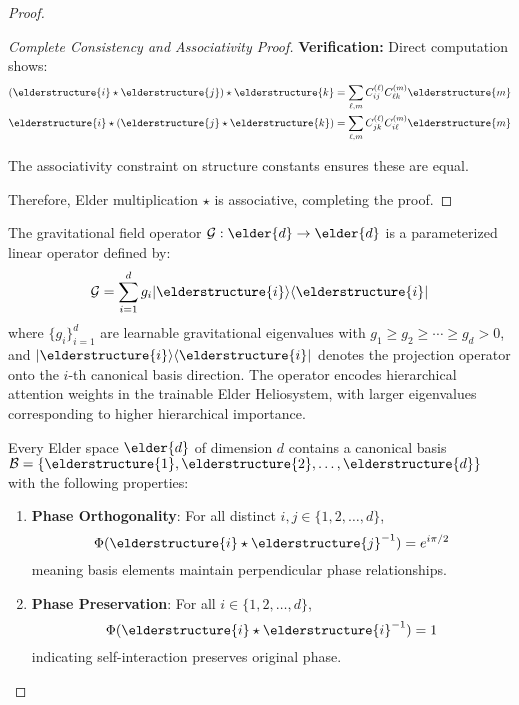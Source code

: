 \begin{proof}
\begin{proof}[Complete Consistency and Associativity Proof]
\textbf{Verification:} Direct computation shows:
\begin{align}
(\elderstructure{i} \star \elderstructure{j}) \star \elderstructure{k} &= \sum_{\ell,m} C_{ij}^{(\ell)} C_{\ell k}^{(m)} \elderstructure{m}\\
\elderstructure{i} \star (\elderstructure{j} \star \elderstructure{k}) &= \sum_{\ell,m} C_{jk}^{(\ell)} C_{i\ell}^{(m)} \elderstructure{m}
\end{align}

The associativity constraint on structure constants ensures these are equal.

Therefore, Elder multiplication $\star$ is associative, completing the proof.
\end{proof}

\begin{definition}
The gravitational field operator $\mathcal{G}: \elder{d} \rightarrow \elder{d}$ is a parameterized linear operator defined by:
\begin{equation}
\mathcal{G} = \sum_{i=1}^{d} g_i |\elderstructure{i}\rangle\langle\elderstructure{i}|
\end{equation}
where $\{g_i\}_{i=1}^{d}$ are learnable gravitational eigenvalues with $g_1 \geq g_2 \geq \cdots \geq g_d > 0$, and $|\elderstructure{i}\rangle\langle\elderstructure{i}|$ denotes the projection operator onto the $i$-th canonical basis direction. The operator encodes hierarchical attention weights in the trainable Elder Heliosystem, with larger eigenvalues corresponding to higher hierarchical importance.
\end{definition}

\begin{theorem}
Every Elder space $\elder{d}$ of dimension $d$ contains a canonical basis $\mathcal{B} = \{\elderstructure{1}, \elderstructure{2}, \ldots, \elderstructure{d}\}$ with the following properties:
\begin{enumerate}
    \item \textbf{Phase Orthogonality}: For all distinct $i, j \in \{1, 2, \ldots, d\}$,
    \begin{equation}
        \Phi(\elderstructure{i} \star \elderstructure{j}^{-1}) = e^{i\pi/2}
    \end{equation}
    meaning basis elements maintain perpendicular phase relationships.
    
    \item \textbf{Phase Preservation}: For all $i \in \{1, 2, \ldots, d\}$,
    \begin{equation}
        \Phi(\elderstructure{i} \star \elderstructure{i}^{-1}) = 1
    \end{equation}
    indicating self-interaction preserves original phase.
    

\end{enumerate}
\end{theorem}
\end{proof}
